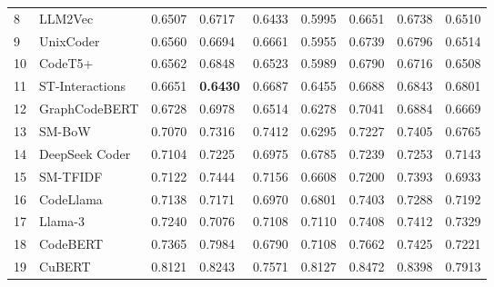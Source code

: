 \begin{table}[h]
{\begin{tabular}{ll|lllllll}
8  &          LLM2Vec &              0.6507 &              0.6717 &              0.6433 &              0.5995 &              0.6651 &              0.6738 &              0.6510 \\
9  &        UnixCoder &              0.6560 &              0.6694 &              0.6661 &              0.5955 &              0.6739 &              0.6796 &              0.6514 \\
10 &          CodeT5+ &              0.6562 &              0.6848 &              0.6523 &              0.5989 &              0.6790 &              0.6716 &              0.6508 \\
11 &  ST-Interactions &              0.6651 &     \textbf{0.6430} &              0.6687 &              0.6455 &              0.6688 &              0.6843 &              0.6801 \\
12 &    GraphCodeBERT &              0.6728 &              0.6978 &              0.6514 &              0.6278 &              0.7041 &              0.6884 &              0.6669 \\
13 &           SM-BoW &              0.7070 &              0.7316 &              0.7412 &              0.6295 &              0.7227 &              0.7405 &              0.6765 \\
14 &      DeepSeek Coder   &              0.7104 &              0.7225 &              0.6975 &              0.6785 &              0.7239 &              0.7253 &              0.7143 \\
15 &         SM-TFIDF &              0.7122 &              0.7444 &              0.7156 &              0.6608 &              0.7200 &              0.7393 &              0.6933 \\
16 &   CodeLlama &              0.7138 &              0.7171 &              0.6970 &              0.6801 &              0.7403 &              0.7288 &              0.7192 \\
17 &          Llama-3 &              0.7240 &              0.7076 &              0.7108 &              0.7110 &              0.7408 &              0.7412 &              0.7329 \\
18 &         CodeBERT &              0.7365 &              0.7984 &              0.6790 &              0.7108 &              0.7662 &              0.7425 &              0.7221 \\
19 &           CuBERT &              0.8121 &              0.8243 &              0.7571 &              0.8127 &              0.8472 &              0.8398 &              0.7913 \\

\end{tabular}}
\end{table}
